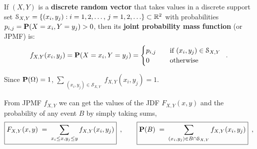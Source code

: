 \begin{definition}[JPMF]
If $(X,Y)$ is a {\bf discrete random vector} that takes values in a discrete support set $\mathcal{S}_{X,Y} = \{(x_i,y_j): i=1,2,\ldots, \, j=1,2,\ldots\} \subset \mathbb{R}^2$ with probabilities $p_{i,j}=\mathbf{P}(X=x_i,Y=y_j)>0$, then its \textbf{joint probability mass function} (or JPMF) is:
\begin{equation}\label{Eq:j2DPMF}
f_{X,Y}(x_i,y_j) = \p(X=x_i,Y=y_j) %
=\begin{cases}
p_{i,j}&\quad \textrm{if } (x_i,y_j) \in \mathcal{S}_{X,Y}\\
0&\quad \textrm{otherwise}
\end{cases}  \enspace .
\end{equation}

Since $\mathbf{P}(\Omega)=1$, $\sum_{{\substack{(x_i,y_j) \in \mathcal{S}_{X,Y}}}}f_{X,Y}(x_i,y_j)=1$.
\end{definition}

From JPMF $f_{X,Y}$ we can get the values of the JDF $F_{X,Y}(x,y)$ and the probability of any event $B$ by simply taking sums,
\begin{equation}\label{Eq:2DiscretejDFFromjPMF}
\boxed{F_{X,Y}(x,y)\;=\;\sum_{x_i\leq x, y_j \leq y}f_{X,Y}(x_i,y_j) }\enspace ,
\qquad \boxed{\mathbf{P}(B)\;=\;\sum_{\substack{(x_i, y_j) \in B \cap \mathcal{S}_{X,Y}}}f_{X,Y}(x_i,y_j) }\enspace ,
\end{equation}

